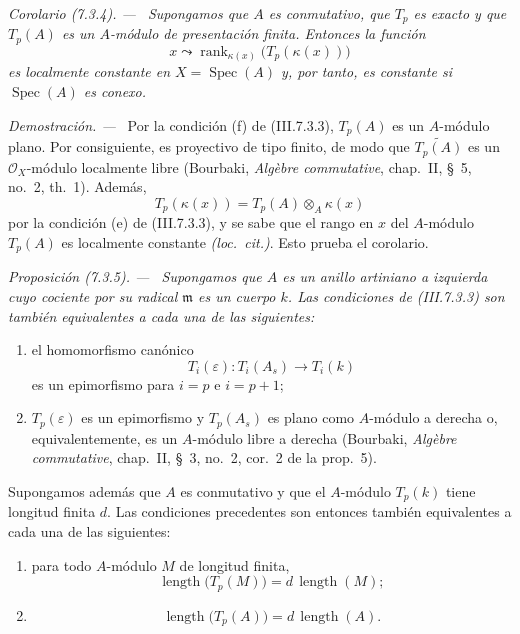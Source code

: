 \documentclass[10pt,oneside]{book}
\newcommand{\sh}[1]{\mathscr{#1}}
\newcommand{\kres}{\kappa}
\newcommand{\Spec}{\operatorname{Spec}}
\newcommand{\sref}[2][]{\textup{(#2)}}
\newcommand{\oldpage}[2][]{\setcounter{footnote}{0}\marginpar{\scriptsize\textbf{#1}~|~#2}\ignorespaces}
\newenvironment{proposition}[1][]{\par\medskip\noindent\itshape Proposición (#1). ---\ }{\par}
\newenvironment{corollary}[1][]{\par\medskip\noindent\itshape Corolario (#1). ---\ }{\par}
\newenvironment{proof}{\par\medskip\noindent\textit{Demostración. ---\ }}{\par}
\begin{document}
\oldpage[III]{182}

\begin{corollary}[7.3.4]
\label{III.7.3.4}
Supongamos que $A$ es conmutativo, que $T_p$ es exacto y que
$T_p(A)$ es un $A$-módulo de presentación finita. Entonces la
función
\[
  x\leadsto
  \operatorname{rank}_{\kres(x)}
  \bigl(T_p(\kres(x))\bigr)
\]
es localmente constante en $X=\Spec(A)$ y, por tanto, es constante
si $\Spec(A)$ es conexo.
\end{corollary}

\begin{proof}
Por la condición (f) de \sref{III.7.3.3}, $T_p(A)$ es un
$A$-módulo plano. Por consiguiente, es proyectivo de tipo finito, de
modo que $\widetilde{T_p(A)}$ es un $\sh O_X$-módulo localmente
libre (Bourbaki, \emph{Alg\`ebre commutative}, chap.~II, \S~5,
no.~2, th.~1). Además,
\[
  T_p(\kres(x))
  =
  T_p(A)\otimes_A\kres(x)
\]
por la condición (e) de \sref{III.7.3.3}, y se sabe que el rango en
$x$ del $A$-módulo $T_p(A)$ es localmente constante
\emph{(loc.\ cit.)}. Esto prueba el corolario.
\end{proof}

\begin{proposition}[7.3.5]
\label{III.7.3.5}
Supongamos que $A$ es un anillo artiniano a izquierda cuyo cociente
por su radical $\mathfrak m$ es un cuerpo $k$. Las condiciones de
\sref{III.7.3.3} son también equivalentes a cada una de las
siguientes:
\begin{enumerate}
  \item[(g)] el homomorfismo canónico
    \[
      T_i(\varepsilon):T_i(A_s)\longrightarrow T_i(k)
    \]
    es un epimorfismo para $i=p$ e $i=p+1$;
  \item[(h)] $T_p(\varepsilon)$ es un epimorfismo y
    $T_p(A_s)$ es plano como $A$-módulo a derecha \textup{o,
    equivalentemente, es un $A$-módulo} libre a derecha \textup{(Bourbaki,
    \emph{Alg\`ebre commutative}, chap.~II, \S~3, no.~2,
    cor.~2 de la prop.~5)}.
\end{enumerate}
Supongamos además que $A$ es conmutativo y que el $A$-módulo
$T_p(k)$ tiene longitud finita $d$. Las condiciones precedentes son
entonces también equivalentes a cada una de las siguientes:
\begin{enumerate}
  \item[(i)] para todo $A$-módulo $M$ de longitud finita,
    \[
      \operatorname{length}\bigl(T_p(M)\bigr)
      =
      d\,\operatorname{length}(M);
      \tag{7.3.5.1}\label{III.7.3.5.1.eq}
    \]
  \item[(j)]
    \[
      \operatorname{length}\bigl(T_p(A)\bigr)
      =
      d\,\operatorname{length}(A).
      \tag{7.3.5.2}\label{III.7.3.5.2.eq}
    \]
\end{enumerate}
\end{proposition}
\end{document}
